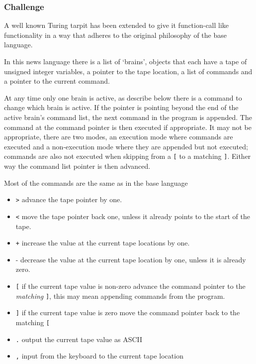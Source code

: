 \documentclass[12pt]{article}
\begin{document}
\subsubsection*{Challenge}
A well known Turing tarpit has been extended to give it function-call
like functionality in a way that adheres to the original philosophy of
the base language.

In this news language there is a list of \lq{}brains\rq{}, objects
that each have a tape of unsigned integer variables, a pointer to the
tape location, a list of commands and a pointer to the current
command.

At any time only one brain is active, as describe below there is a command to change which brain is active. If the pointer is pointing
beyond the end of the active brain's command list, the next command in the
program is appended. The command at the command pointer is then
executed if appropriate. It may not be appropriate, there are two
modes, an execution mode where commands are executed and a
non-execution mode where they are appended but not executed; commands
are also not executed when skipping from a \texttt{[} to a matching
  \texttt{]}. Either way the command list pointer is then advanced.

Most of the commands are the same as in the base language
\begin{itemize}
\item \texttt{>} advance the tape pointer by one.
\item \texttt{<} move the tape pointer back one, unless it already points to
  the start of the tape.
\item \texttt{+} increase the value at the current tape locations by one.
\item - decrease the value at the current tape location by one, unless it is already zero.
\item \texttt{[} if the current tape value is non-zero advance the command pointer to the \textsl{matching} \texttt{]}, this may mean appending commands from the program.
\item \texttt{]} if the current tape value is zero move the command pointer
  back to the matching \texttt{[}
\item \texttt{.} output the current tape value as ASCII
\item \texttt{,} input from the keyboard to the current tape location
\end{itemize}
\end{document}
